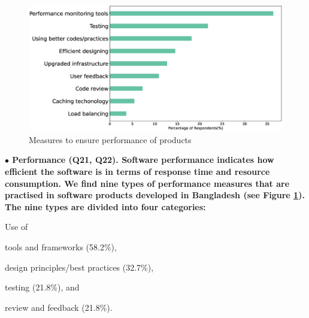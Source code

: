 \begin{figure}[h]
\centering
\includegraphics[scale=0.22]{Figures/Performance.eps} 
\caption{Measures to ensure performance of products}
\label{fig:Measures to ensure performance}
\end{figure}
\nd\bf{$\bullet$ Performance (Q21, Q22).} Software performance indicates how efficient the software is in terms of response time and resource consumption. 
We find nine types of performance measures that are practised in software products developed in Bangladesh (see Figure \ref{fig:Measures to ensure performance}).  
The nine types are divided into four categories: 
\begin{inparaenum}
Use of \item tools and frameworks (58.2\%),
\item design principles/best practices (32.7\%),
\item testing (21.8\%), and
\item review and feedback (21.8\%).
\end{inparaenum} 

